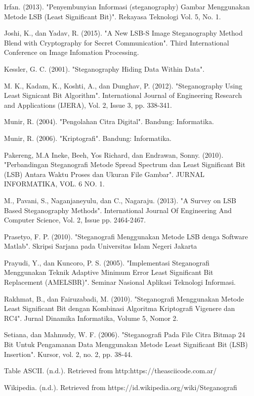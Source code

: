 \documentclass{jtetiskripsi}
\begin{document}
\begin{thebibliography}{99}
	Irfan. (2013). "Penyembunyian Informasi (steganography) Gambar Menggunakan Metode LSB (Least Significant Bit)". Rekayasa Teknologi Vol. 5, No. 1.
	
	Joshi, K., dan Yadav, R. (2015). "A New LSB-S Image Steganography Method Blend with Cryptography for Secret Communication". Third International Conference on Image Infomation Processing.
	
	Kessler, G. C. (2001). "Steganography Hiding Data Within Data".
	
	M. K., Kadam, K., Koshti, A., dan Dunghav, P. (2012). "Steganography Using Least Signicant Bit Algorithm". International Journal of Engineering Research and Applications (IJERA), Vol. 2, Issue 3, pp. 338-341.
	
	Munir, R. (2004). "Pengolahan Citra Digital". Bandung: Informatika.
	
	Munir, R. (2006). "Kriptografi". Bandung: Informatika.
	
	Pakereng, M.A Ineke, Beeh, Yos Richard, dan Endrawan, Sonny. (2010). "Perbandingan Steganografi Metode Spread Spectrum dan Least Significant Bit (LSB) Antara Waktu Proses dan Ukuran File Gambar". JURNAL INFORMATIKA, VOL. 6 NO. 1.
	
	M., Pavani, S., Naganjaneyulu, dan C., Nagaraju. (2013). "A Survey on LSB Based Steganography Methods". International Journal Of Engineering And Computer Science, Vol. 2, Issue pp. 2464-2467.
	
	Prasetyo, F. P. (2010). "Steganografi Menggunakan Metode LSB denga Software Matlab". Skripsi Sarjana pada Universitas Islam Negeri Jakarta
	
	Prayudi, Y., dan Kuncoro, P. S. (2005). "Implementasi Steganografi Menggunakan Teknik Adaptive Minimum Error Least Significant Bit Replacement (AMELSBR)". Seminar Nasional Aplikasi Teknologi Informasi.
	
	Rakhmat, B., dan Fairuzabadi, M. (2010). "Steganografi Menggunakan Metode Least Significant Bit dengan Kombinasi Algoritma Kriptografi Vigenere dan RC4". Jurnal Dinamika Informatika, Volume 5, Nomor 2.
	
	Setiana, dan Mahmudy, W. F. (2006). "Steganografi Pada File Citra Bitmap 24 Bit Untuk Pengamanan Data Menggunakan Metode Least Significant Bit (LSB) Insertion". Kursor, vol. 2, no. 2, pp. 38-44.
	
	Table ASCII. (n.d.). Retrieved from http:https://theasciicode.com.ar/
	
	Wikipedia. (n.d.). Retrieved from https://id.wikipedia.org/wiki/Steganografi
		
		
	
\end{thebibliography}



%
\end{document}
